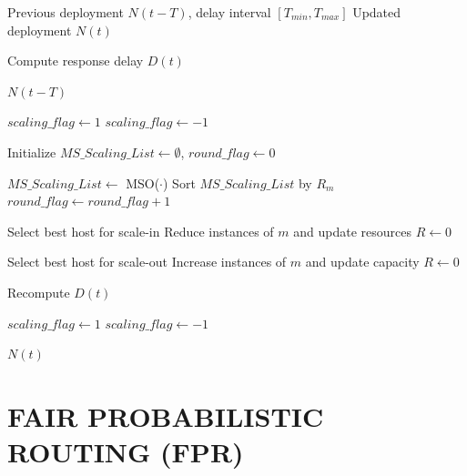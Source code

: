 \begin{algorithm}[H]
\caption{MFDS (Optimized)}
\begin{algorithmic}[1]

\Require Previous deployment $N(t-T)$, delay interval $[T_{min},T_{max}]$
\Ensure Updated deployment $N(t)$

\State Compute response delay $D(t)$

    \State \Return $N(t-T)$
\EndIf

    \State $scaling\_flag \leftarrow 1$
\Else
    \State $scaling\_flag \leftarrow -1$
\EndIf

\State Initialize $MS\_Scaling\_List \leftarrow \emptyset$, $round\_flag \leftarrow 0$


    \State $MS\_Scaling\_List \leftarrow$ MSO($\cdot$)
    \State Sort $MS\_Scaling\_List$ by $R_m$
    \State $round\_flag \leftarrow round\_flag + 1$


                \State Select best host for scale-in
                \State Reduce instances of $m$ and update resources
                \State $R \leftarrow 0$
            \EndIf

                \State Select best host for scale-out
                \State Increase instances of $m$ and update capacity
                \State $R \leftarrow 0$
            \EndIf

        \EndWhile
    \EndFor

    \State Recompute $D(t)$

        \State $scaling\_flag \leftarrow 1$
    \Else
        \State $scaling\_flag \leftarrow -1$
    \EndIf

\EndWhile

\State \Return $N(t)$

\end{algorithmic}
\end{algorithm}


\section{FAIR PROBABILISTIC ROUTING (FPR)}

